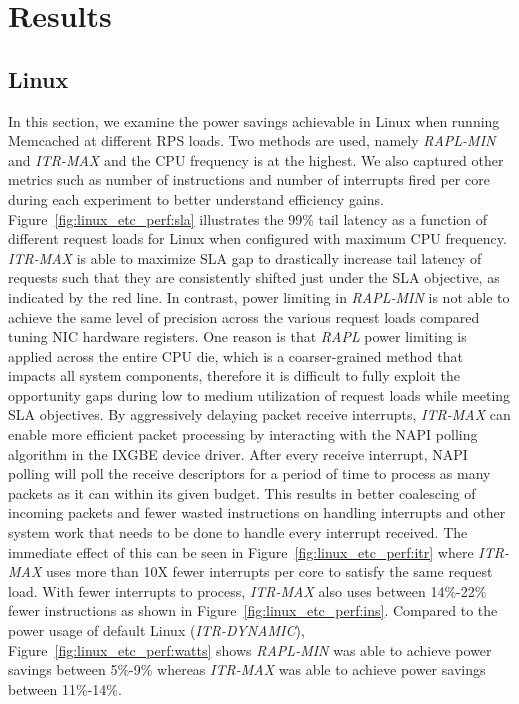 \documentclass[letterpaper,twocolumn,10pt]{article}
\begin{document}
\section{Results}
\label{sec:res}
\subsection{Linux}
In this section, we examine the power savings achievable in Linux when running Memcached at different RPS loads. Two methods are used, namely \textit{RAPL-MIN} and \textit{ITR-MAX} and the CPU frequency is at the highest. We also captured other metrics such as number of instructions and number of interrupts fired per core during each experiment to better understand efficiency gains. Figure~\ref{fig:linux_etc_perf:sla} illustrates the 99\% tail latency as a function of different request loads for Linux when configured with maximum CPU frequency. \textit{ITR-MAX} is able to maximize SLA gap to drastically increase tail latency of requests such that they are consistently shifted just under the SLA objective, as indicated by the red line. In contrast, power limiting in \textit{RAPL-MIN} is not able to achieve the same level of precision across the various request loads compared tuning NIC hardware registers. One reason is that \textit{RAPL} power limiting is applied across the entire CPU die, which is a coarser-grained method that impacts all system components, therefore it is difficult to fully exploit the opportunity gaps during low to medium utilization of request loads while meeting SLA objectives. By aggressively delaying packet receive interrupts, \textit{ITR-MAX} can enable more efficient packet processing by interacting with the NAPI polling algorithm in the IXGBE device driver. After every receive interrupt, NAPI polling will poll the receive descriptors for a period of time to process as many packets as it can within its given budget. This results in better coalescing of incoming packets and fewer wasted instructions on handling interrupts and other system work that needs to be done to handle every interrupt received. The immediate effect of this can be seen in Figure~\ref{fig:linux_etc_perf:itr} where \textit{ITR-MAX} uses more than 10X fewer interrupts per core to satisfy the same request load. With fewer interrupts to process, \textit{ITR-MAX} also uses between 14\%-22\% fewer instructions as shown in Figure~\ref{fig:linux_etc_perf:ins}. Compared to the power usage of default Linux (\textit{ITR-DYNAMIC}), Figure~\ref{fig:linux_etc_perf:watts} shows \textit{RAPL-MIN} was able to achieve power savings between 5\%-9\% whereas \textit{ITR-MAX} was able to achieve power savings between 11\%-14\%.
\end{document}
